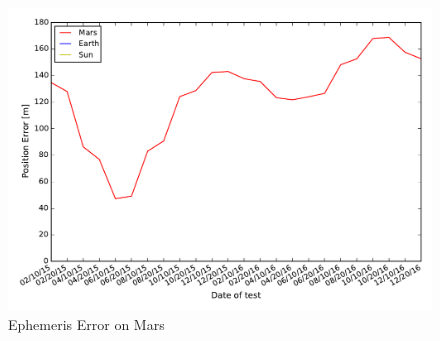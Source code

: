 \begin{figure}[htbp]
\centerline{
\includegraphics[height=0.7\textwidth, keepaspectratio]{AutoTeX/EphemMars}}
\caption{Ephemeris Error on Mars}
\label{fig:EphemMars}
\end{figure}